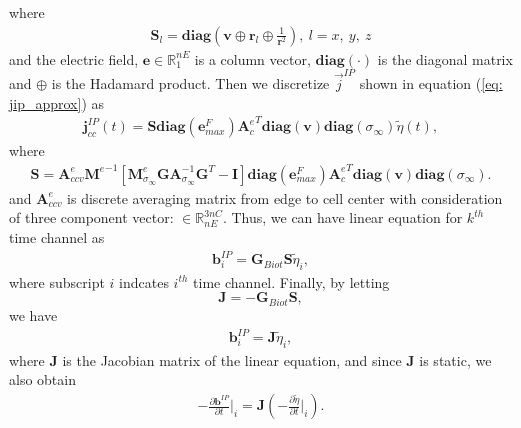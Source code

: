 \documentclass[a4paper, 11pt]{article}
\newcommand{\siginf}{\sigma_\infty}
\newcommand{\Ace}{{\mathbf A_c^e}}
\newcommand{\diag}{\mathbf{diag}}
\newcommand{\M}{{\mathbf M}}
\newcommand{\MeSigInf}{{\M^e_{\sigma_\infty}}}
\newcommand{\Me}{{\M^e}}
\renewcommand {\j}  { {\vec j} }
\renewcommand {\dj}  { {\mathbf{j} } }
\newcommand {\db}  { {\mathbf{b} } }
\newcommand {\de}  { {\mathbf{e} } }
\newcommand{\vol}{\mathbf{v}}
\newcommand{\A}{\mathbf{A}}
\newcommand{\Gbiot}{\mathbf{G}_{Biot}}
\newcommand{\peta}{\tilde{\eta}}
\begin{document}
where
\begin{eqnarray*}
  \mathbf{S}_l =\diag(\mathbf{v}\oplus \mathbf{r}_l \oplus \frac{1}{\mathbf{r}^2}), \ l = x, \ y, \ z
\end{eqnarray*}
and the electric field, $\mathbf{e} \in \mathbb{R}^{nE}_1$ is a column vector, $\diag(\cdot)$ is the diagonal matrix and $\oplus$ is the Hadamard product. 
Then we discretize $\j^{IP}$ shown in equation (\ref{eq: jip_approx}) as
\begin{eqnarray}
  \dj^{IP}_{cc}(t) = \mathbf{S}\diag(\de^{F}_{max})\Ace^T\diag(\vol)\diag(\siginf)\peta(t),
\end{eqnarray}
where
\begin{eqnarray}
  \mathbf{S} = \mathbf{A}^{e}_{ccv}\Me^{-1}[\MeSigInf \mathbf{G} \A_{\siginf}^{-1}\mathbf{G}^T  - \mathbf{I}] \diag(\de^{F}_{max})\Ace^T\diag(\vol)\diag(\siginf).
\end{eqnarray}
and $\mathbf{A}^{e}_{ccv}$ is discrete averaging matrix from edge to cell center with consideration of three component vector: $\in \mathbb{R}^{3nC}_{nE}$. 
Thus, we can have linear equation for $k^{th}$ time channel as
\begin{eqnarray*}
  \db^{IP}_i = \Gbiot \mathbf{S} \peta_i,
\end{eqnarray*}
where subscript $i$ indcates $i^{th}$ time channel. Finally, by letting
\begin{equation}
  \mathbf{J} = -\Gbiot\mathbf{S},
  \label{eq: Sense}
\end{equation}
we have
\begin{eqnarray}
  \db^{IP}_i = \mathbf{J}\peta_i,
  \label{eq: bIP_linear}
\end{eqnarray}
where $\mathbf{J}$ is the Jacobian matrix of the linear equation, and since $\mathbf{J}$ is static, we also obtain
\begin{eqnarray}
  -\frac{\partial\db^{IP}}{\partial t}\Big|_i = \mathbf{J}(-\frac{\partial \peta}{\partial t}\Big|_i).
  \label{eq: dbIPdt_linear}
\end{eqnarray}



\end{document}
